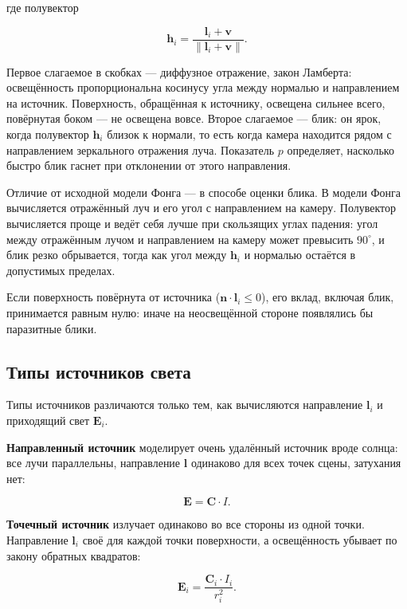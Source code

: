 \documentclass[14pt,a4paper]{extarticle}
\begin{document}
где полувектор

\begin{equation}
	\mathbf{h}_i = \frac{\mathbf{l}_i + \mathbf{v}}{\|\mathbf{l}_i + \mathbf{v}\|}.
	\label{eq:half}
\end{equation}

Первое слагаемое в скобках — диффузное отражение, закон Ламберта: освещённость
пропорциональна косинусу угла между нормалью и направлением на источник.
Поверхность, обращённая к источнику, освещена сильнее всего, повёрнутая боком —
не освещена вовсе. Второе слагаемое — блик: он ярок, когда полувектор
$\mathbf{h}_i$ близок к нормали, то есть когда камера находится рядом с
направлением зеркального отражения луча. Показатель $p$ определяет, насколько
быстро блик гаснет при отклонении от этого направления.

Отличие от исходной модели Фонга — в способе оценки блика. В модели Фонга
вычисляется отражённый луч и его угол с направлением на камеру. Полувектор
вычисляется проще и ведёт себя лучше при скользящих углах падения: угол между
отражённым лучом и направлением на камеру может превысить $90^\circ$, и блик
резко обрывается, тогда как угол между $\mathbf{h}_i$ и нормалью остаётся в
допустимых пределах.

Если поверхность повёрнута от источника ($\mathbf{n} \cdot \mathbf{l}_i \le 0$),
его вклад, включая блик, принимается равным нулю: иначе на неосвещённой стороне
появлялись бы паразитные блики.

\subsection{Типы источников света}

Типы источников различаются только тем, как вычисляются направление
$\mathbf{l}_i$ и приходящий свет $\mathbf{E}_i$.

\textbf{Направленный источник} моделирует очень удалённый источник вроде
солнца: все лучи параллельны, направление $\mathbf{l}$ одинаково для всех точек
сцены, затухания нет:

\begin{equation}
	\mathbf{E} = \mathbf{C} \cdot I.
\end{equation}

\textbf{Точечный источник} излучает одинаково во все стороны из одной точки.
Направление $\mathbf{l}_i$ своё для каждой точки поверхности, а освещённость
убывает по закону обратных квадратов:

\begin{equation}
	\mathbf{E}_i = \frac{\mathbf{C}_i \cdot I_i}{r_i^2}.
	\label{eq:point}
\end{equation}
\end{document}
